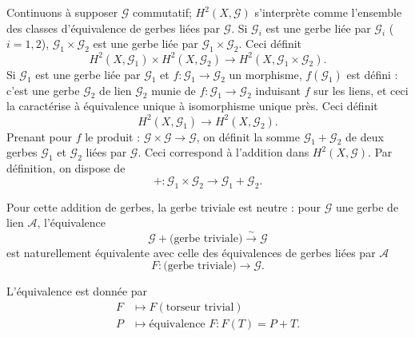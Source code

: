 \documentclass[12pt,a4paper]{article}
\theoremstyle{plain}
\theoremstyle{definition}
\theoremstyle{remark}
\begin{document}
Continuons à supposer $\mathscr{G}$ commutatif; $H^2(X, \mathscr{G})$ s'interprète comme l'ensemble
des classes d'équivalence de gerbes liées par $\mathscr{G}$. Si $\mathscr{G}_i$ est une gerbe liée par $\mathscr{G}_i$ ($i = 1, 2$),
$\mathscr{G}_1 \times \mathscr{G}_2$ est une gerbe liée par $\mathscr{G}_1 \times \mathscr{G}_2$. Ceci définit
\[
H^2(X, \mathscr{G}_1) \times H^2(X, \mathscr{G}_2) \to H^2(X, \mathscr{G}_1 \times \mathscr{G}_2).
\]
Si $\mathscr{G}_1$ est une gerbe liée par $\mathscr{G}_1$ et $f : \mathscr{G}_1 \to \mathscr{G}_2$ un morphisme, $f(\mathscr{G}_1)$ est défini : c'est
une gerbe $\mathscr{G}_2$ de lien $\mathscr{G}_2$ munie de $f : \mathscr{G}_1 \to \mathscr{G}_2$ induisant $f$ sur les liens, et ceci la caractérise à équivalence unique à isomorphisme unique près. Ceci définit
\[
H^2(X, \mathscr{G}_1) \to H^2(X, \mathscr{G}_2).
\]
Prenant pour $f$ le produit : $\mathscr{G} \times \mathscr{G} \to \mathscr{G}$, on définit la somme $\mathscr{G}_1 + \mathscr{G}_2$ de deux gerbes $\mathscr{G}_1$
et $\mathscr{G}_2$ liées par $\mathscr{G}$. Ceci correspond à l'addition dans $H^2(X, \mathscr{G})$. Par définition, on dispose de
\begin{equation}\label{eq:5.3.1}
+ : \mathscr{G}_1 \times \mathscr{G}_2 \to \mathscr{G}_1 + \mathscr{G}_2.
\end{equation}

Pour cette addition de gerbes, la gerbe triviale est neutre : pour $\mathscr{G}$ une gerbe de lien
$\mathscr{A}$, l'équivalence
\begin{equation}\label{eq:5.3.2}
\mathscr{G} + \text{(gerbe triviale)} \xrightarrow{\sim} \mathscr{G}
\end{equation}
est naturellement équivalente avec celle des équivalences de gerbes liées par $\mathscr{A}$
\[
F : \text{(gerbe triviale)} \to \mathscr{G}.
\]

L'équivalence est donnée par
\begin{align*}
F &\mapsto F(\text{torseur trivial}) \\
P &\mapsto \text{équivalence } F : F(T) = P + T.
\end{align*}
\end{document}
